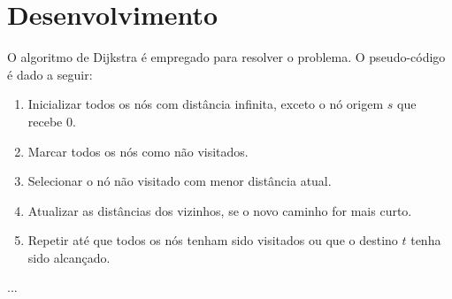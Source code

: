 \section{Desenvolvimento} \label{sec:algorithm}

O algoritmo de Dijkstra é empregado para resolver o problema.
O pseudo-código é dado a seguir:

\begin{enumerate}
    \item Inicializar todos os nós com distância infinita, exceto o nó origem $s$ que recebe 0.
    \item Marcar todos os nós como não visitados.
    \item Selecionar o nó não visitado com menor distância atual.
    \item Atualizar as distâncias dos vizinhos, se o novo caminho for mais curto.
    \item Repetir até que todos os nós tenham sido visitados ou que o destino $t$ tenha sido alcançado.
\end{enumerate}

...
